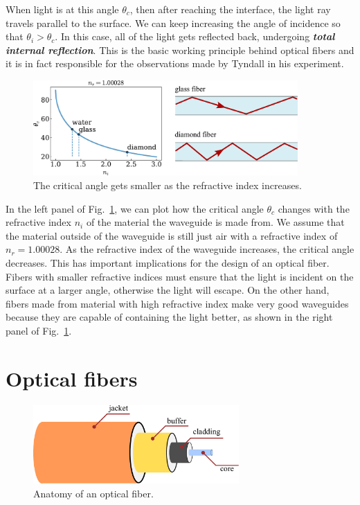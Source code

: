 When light is at this angle $\theta_c$, then after reaching the interface, the light ray travels parallel to the surface.
We can keep increasing the angle of incidence so that $\theta_i > \theta_c$.
In this case, all of the light gets reflected back, undergoing \textit{\textbf{total internal reflection}}.
This is the basic working principle behind optical fibers and it is in fact responsible for the observations made by Tyndall in his experiment.

\begin{figure}
    \centering
    \includegraphics[width=0.9\textwidth]{lesson7/7-3_crit_angle.pdf}
    \caption[Critical angle]{The critical angle gets smaller as the refractive index increases.}
    \label{fig:7-3_crit_angle}
\end{figure}

In the left panel of Fig.~\ref{fig:7-3_crit_angle}, we can plot how the critical angle $\theta_c$ changes with the refractive index $n_i$ of the material the waveguide is made from.
We assume that the material outside of the waveguide is still just air with a refractive index of $n_r = 1.00028$.
As the refractive index of the waveguide increases, the critical angle decreases.
This has important implications for the design of an optical fiber.
Fibers with smaller refractive indices must ensure that the light is incident on the surface at a larger angle, otherwise the light will escape.
On the other hand, fibers made from material with high refractive index make very good waveguides because they are capable of containing the light better, as shown in the right panel of Fig.~\ref{fig:7-3_crit_angle}.



\section{Optical fibers}
\label{sec:7-4_optical fibers}

\begin{figure}[t]
    \centering
    \includegraphics[width=0.7\textwidth]{lesson7/7-4_fiber.pdf}
    \caption[Anatomy of an optical fiber]{Anatomy of an optical fiber.}
    \label{fig:7-4_fiber}
\end{figure}

